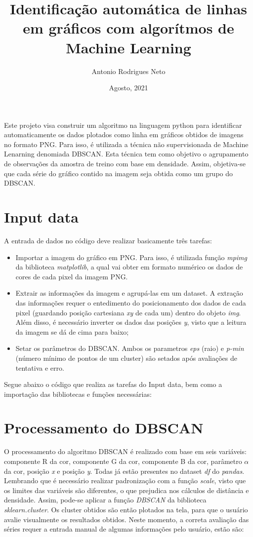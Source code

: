 \documentclass{article}
\title{Identificação automática de linhas em gráficos com algorítmos de Machine Learning}
\author{Antonio Rodrigues Neto}
\date{Agosto, 2021}
\begin{document}
    \maketitle
    Este projeto visa construir um algoritmo na linguagem python para identificar automaticamente os dados plotados como linha em gráficos obtidos de imagens no formato PNG. Para isso, é utilizada a técnica não supervisionada de Machine Lenarning denomiada DBSCAN. Esta técnica tem como objetivo o agrupamento de observações da amostra de treino com base em densidade. Assim, objetiva-se que cada série do gráfico contido na imagem seja obtida como um grupo do DBSCAN.
    
    \section{Input data}
    
    A entrada de dados no código deve realizar basicamente três tarefas:
    
    \begin{itemize}
        \item Importar a imagem do gráfico em PNG. Para isso, é utilizada função \textit{mpimg} da biblioteca \textit{matplotlib}, a qual vai obter em formato numérico os dados de cores de cada pixel da imagem PNG.
        \item Extrair as informações da imagem e agrupá-las em um dataset. A extração das informações requer o entedimento do posicionamento dos dados de cada pixel (guardando posição cartesiana \textit{xy} de cada um) dentro do objeto \textit{img}. Além disso, é necessário inverter os dados das posições \textit{y}, visto que a leitura da imagem se dá de cima para baixo;
        \item Setar os parâmetros do DBSCAN. Ambos os parametros \textit{eps} (raio) e \textit{p-min} (número mínimo de pontos de um cluster) são setados após avaliações de tentativa e erro.
    \end{itemize}
    
    Segue abaixo o código que realiza as tarefas do Input data, bem como a importação das bibliotecas e funções necessárias:
    
    
    \section{Processamento do DBSCAN}
    
    O processamento do algoritmo DBSCAN é realizado com base em seis variáveis: componente R da cor, componente G da cor, componente B da cor, parâmetro $\alpha$ da cor, posição \textit{x} e posição \textit{y}. Todas já estão presentes no dataset \textit{df} do \textit{pandas}. Lembrando que é necessário realizar padronização com a função \textit{scale}, visto que os limites das variáveis são diferentes, o que prejudica nos cálculos de distância e densidade.
    Assim, pode-se aplicar a função \textit{DBSCAN} da biblioteca \textit{sklearn.cluster}. Os cluster obtidos são então plotados na tela, para que o usuário avalie visualmente os resultados obtidos.
    Neste momento, a correta avaliação das séries requer a entrada manual de algumas informações pelo usuário, estão são:
    
\end{document}

